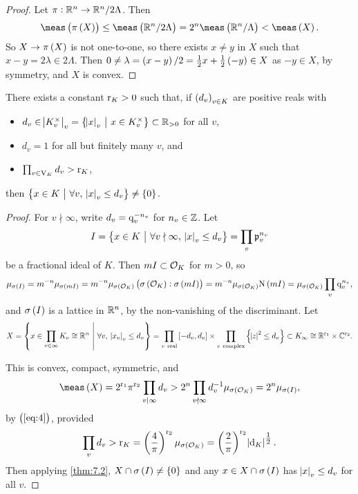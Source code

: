 \begin{proof}
Let $ \pi : \mathbb{R}^n \to \mathbb{R}^n / 2\Lambda $. Then
$$ \meas\br{\pi\br{X}} \le \meas\br{\RR^n / 2\Lambda} = 2^n\meas\br{\RR^n / \Lambda} < \meas\br{X}. $$
So $ X \to \pi\br{X} $ is not one-to-one, so there exists $ x \ne y $ in $ X $ such that $ x - y = 2\lambda \in 2\Lambda $. Then $ 0 \ne \lambda = \br{x - y} / 2 = \tfrac{1}{2}x + \tfrac{1}{2}\br{-y} \in X $ as $ -y \in X $, by symmetry, and $ X $ is convex.
\end{proof}

\begin{theorem}
\label{thm:7.3}
There exists a constant $ \mathrm{r}_K > 0 $ such that, if $ \br{d_v}_{v \in K} $ are positive reals with
\begin{itemize}
\item $ d_v \in \abs{K_v^\times}_v = \cbr{\abs{x}_v \st x \in K_v^\times} \subset \RR_{> 0} $ for all $ v $,
\item $ d_v = 1 $ for all but finitely many $ v $, and
\item $ \prod_{v \in \mathrm{V}_K} d_v > \mathrm{r}_K $,
\end{itemize}
then $ \cbr{x \in K \st \forall v, \ \abs{x}_v \le d_v} \ne \cbr{0} $.
\end{theorem}

\begin{proof}
For $ v \nmid \infty $, write $ d_v = \mathrm{q}_v^{-n_v} $ for $ n_v \in \mathbb{Z} $. Let
$$ I = \cbr{x \in K \st \forall v \nmid \infty, \ \abs{x}_v \le d_v} = \prod_v \ppp_v^{n_v} $$
be a fractional ideal of $ K $. Then $ mI \subset \mathcal{O}_K $ for $ m > 0 $, so
\begin{equation}
\label{eq:4}
\mu_{\sigma\br{I}} = m^{-n}\mu_{\sigma\br{mI}} = m^{-n}\mu_{\sigma\br{\OOO_K}}\br{\sigma\br{\OOO_K} : \sigma\br{mI}} = m^{-n}\mu_{\sigma\br{\OOO_K}}\N\br{mI} = \mu_{\sigma\br{\OOO_K}}\prod_v \q_v^{n_v},
\end{equation}
and $ \sigma\br{I} $ is a lattice in $ \mathbb{R}^n $, by the non-vanishing of the discriminant. Let
$$ X = \cbr{x \in \prod_{v \in \infty} K_v \cong \RR^n \st \forall v, \ \abs{x_v}_v \le d_v} = \prod_{v \ \text{real}} \sbr{-d_v, d_v} \times \prod_{v \ \text{complex}} \cbr{\abs{z}^2 \le d_v} \subset K_\infty \cong \RR^{\r_1} \times \CC^{\r_2}. $$

\pagebreak

This is convex, compact, symmetric, and
$$ \meas\br{X} = 2^{\r_1}\pi^{\r_2}\prod_{v \mid \infty} d_v > 2^n\prod_{v \nmid \infty} d_v^{-1}\mu_{\sigma\br{\OOO_K}} = 2^n\mu_{\sigma\br{I}}, $$
by $ \br{\ref{eq:4}} $, provided
$$ \prod_v d_v > \r_K = \br{\dfrac{4}{\pi}}^{\r_2}\mu_{\sigma\br{\OOO_K}} = \br{\dfrac{2}{\pi}}^{\r_2}\abs{\d_K}^{\tfrac{1}{2}}. $$
Then applying \ref{thm:7.2}, $ X \cap \sigma\br{I} \ne \cbr{0} $ and any $ x \in X \cap \sigma\br{I} $ has $ \abs{x}_v \le d_v $ for all $ v $.
\end{proof}

